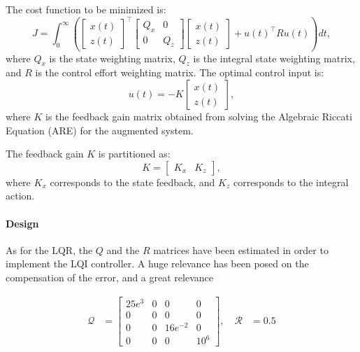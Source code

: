 The cost function to be minimized is:
\begin{equation}
    J = \int_0^\infty \left(
    \begin{bmatrix}
        x(t) \\
        z(t)
    \end{bmatrix}^\top
    \begin{bmatrix}
        Q_x & 0   \\
        0   & Q_z
    \end{bmatrix}
    \begin{bmatrix}
        x(t) \\
        z(t)
    \end{bmatrix}
    + u(t)^\top R u(t)
    \right) dt,
\end{equation}
where \(Q_x\) is the state weighting matrix, \(Q_z\) is the integral state weighting matrix, and \(R\) is the control effort weighting matrix. The optimal control input is:
\begin{equation}
    u(t) = -K
    \begin{bmatrix}
        x(t) \\
        z(t)
    \end{bmatrix},
\end{equation}
where \(K\) is the feedback gain matrix obtained from solving the Algebraic Riccati Equation (ARE) for the augmented system.

The feedback gain \(K\) is partitioned as:
\begin{equation}
    K =
    \begin{bmatrix}
        K_x & K_z
    \end{bmatrix},
\end{equation}
where \(K_x\) corresponds to the state feedback, and \(K_z\) corresponds to the integral action.

\paragraph{Design} As for the LQR, the $Q$ and the $R$ matrices have been estimated in order to implement the LQI controller. A huge relevance has been posed on the compensation of the error, and a great relevance

\begin{equation}
    \begin{aligned}
        \mathcal{Q} & =
        \begin{bmatrix}
            25e^3 & 0 & 0        & 0      \\
            0     & 0 & 0        & 0      \\
            0     & 0 & 16e^{-2} & 0      \\
            0     & 0 & 0        & 10^{6}
        \end{bmatrix},  \quad
        \mathcal{R} & = 0.5
    \end{aligned}
\end{equation}

